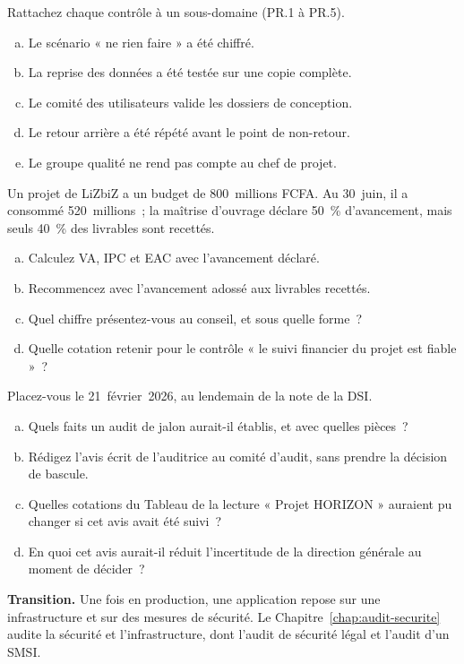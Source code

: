 \begin{boxexo}[title={\ding{45}\quad Exercice~15.1. Rattacher les contrôles \niveaubase}]
Rattachez chaque contrôle à un sous-domaine (PR.1 à PR.5).
\begin{enumerate}[(a)]
    \item Le scénario « ne rien faire » a été chiffré.
    \item La reprise des données a été testée sur une copie complète.
    \item Le comité des utilisateurs valide les dossiers de conception.
    \item Le retour arrière a été répété avant le point de non-retour.
    \item Le groupe qualité ne rend pas compte au chef de projet.
\end{enumerate}
\end{boxexo}

\begin{boxexo}[title={\ding{45}\quad Exercice~15.2. Calculer la valeur acquise \niveaumoyen}]
Un projet de LiZbiZ a un budget de 800~millions FCFA. Au 30~juin, il a
consommé 520~millions~; la maîtrise d'ouvrage déclare 50~\% d'avancement,
mais seuls 40~\% des livrables sont recettés.
\begin{enumerate}[(a)]
    \item Calculez VA, IPC et EAC avec l'avancement déclaré.
    \item Recommencez avec l'avancement adossé aux livrables recettés.
    \item Quel chiffre présentez-vous au conseil, et sous quelle forme~?
    \item Quelle cotation retenir pour le contrôle « le suivi financier du
          projet est fiable »~?
\end{enumerate}
\end{boxexo}

\begin{boxexo}[title={\ding{45}\quad Exercice~15.3. L'audit de jalon d'HORIZON \niveauexpert}]
Placez-vous le 21~février~2026, au lendemain de la note de la DSI.
\begin{enumerate}[(a)]
    \item Quels faits un audit de jalon aurait-il établis, et avec quelles
          pièces~?
    \item Rédigez l'avis écrit de l'auditrice au comité d'audit, sans
          prendre la décision de bascule.
    \item Quelles cotations du Tableau de la lecture « Projet HORIZON »
          auraient pu changer si cet avis avait été suivi~?
    \item En quoi cet avis aurait-il réduit l'incertitude de la direction
          générale au moment de décider~?
\end{enumerate}
\end{boxexo}

\bigskip

\begin{boxinfo}
\textbf{Transition.} Une fois en production, une application repose sur une
infrastructure et sur des mesures de sécurité. Le
Chapitre~\ref{chap:audit-securite} audite la sécurité et l'infrastructure,
dont l'audit de sécurité légal et l'audit d'un SMSI.
\end{boxinfo}
